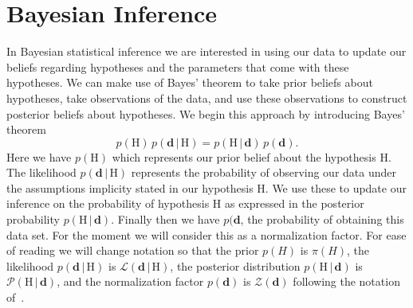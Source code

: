 \section{Bayesian Inference}\label{sec:bayes_inf}
In Bayesian statistical inference we are interested in using our data to update our beliefs regarding hypotheses and the parameters that come with these hypotheses. We can make use of Bayes' theorem to take prior beliefs about hypotheses, take observations of the data, and use these observations to construct posterior beliefs about hypotheses. We begin this approach by introducing Bayes' theorem
\begin{equation} \label{eqn:BayesTheorem_basic}
     p(\mathrm{H}) \, p(\mathbf{d} \, |\, \mathrm{H})  =  p(\mathrm{H} \, | \, \mathbf{d}) \, p(\mathbf{d}).
\end{equation}
Here we have $p(\mathrm{H})$ which represents our prior belief about the hypothesis H. The likelihood $p(\mathbf{d} \, |\, \mathrm{H})$ represents the probability of observing our data under the assumptions implicity stated in our hypothesis H. We use these to update our inference on the probability of hypothesis H as expressed in the posterior probability $p(\mathrm{H} \, | \, \mathbf{d})$. Finally then we have $p(\mathbf{d}$, the probability of obtaining this data set. For the moment we will consider this as a normalization factor. For ease of reading we will change notation so that the prior $p(H)$ is $\pi (H)$, the likelihood $p(\mathbf{d} \, |\, \mathrm{H})$ is $\mathcal{L}(\mathbf{d} \, | \, \mathrm{H})$, the posterior distribution $p(\mathrm{H} \, | \, \mathbf{d})$ is $\mathcal{P}(\mathrm{H} \, | \, \mathbf{d})$, and the normalization factor $p(\mathbf{d})$ is $\mathcal{Z}(\mathbf{d})$ following the notation of~\cite{hobson2010bayesian}.


